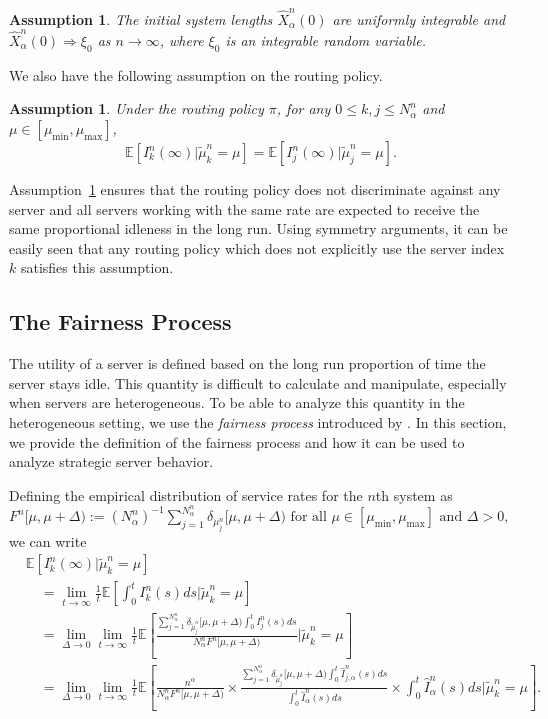 \documentclass[a4paper,11pt,twoside]{article}
\numberwithin{equation}{section}
\numberwithin{figure}{section}
\theoremstyle{plain}
\newtheorem{assumption}[theorem]{Assumption}
\newcommand{\EE}{\mathbb{E}}
\newcommand{\1}{\mathbbm{1}}
\begin{document}
\begin{assumption}\label{asm:initialcondition}
The initial system lengths $\hat{X}_\alpha^n(0)$ are uniformly integrable and $\hat{X}_\alpha^n(0)\Rightarrow \xi_0$ as $n\to\infty$, where $\xi_0$ is an integrable random variable. 
\end{assumption}

We also have the following assumption on the routing policy.
\begin{assumption}\label{asm:non-discrimating}
Under the routing policy $\pi$, for any $0\leq k,j\leq N_\alpha^n$ and $\mu\in[\mu_{\min},\mu_{\max}]$,
\[
\EE[I_k^n(\infty)|\tilde{\mu}_k^n=\mu]=\EE[I_j^n(\infty)|\tilde{\mu}_j^n=\mu].
\]
\end{assumption}


Assumption~\ref{asm:non-discrimating} ensures that the routing policy does not discriminate against any server and all servers working with the same rate are expected to receive the same proportional idleness in the long run. Using symmetry arguments, it can be easily seen that any routing policy which does not explicitly use the server index $k$ satisfies this assumption. 

\subsection{The Fairness Process}\label{sec:fairnessprocess}

The utility of a server is defined based on the long run proportion of time the server stays idle. This quantity is difficult to calculate and manipulate, especially when servers are heterogeneous. To be able to analyze this quantity in the heterogeneous setting, we use the  \emph{fairness process} introduced by \cite{bukeqin2019}. In this section, we provide the definition of the fairness process and how it can be used to analyze strategic server behavior.

Defining the empirical distribution of service rates for the $n$th system as
$F^n[\mu,\mu+\Delta) :=(N_\alpha^n)^{-1}\sum_{j=1}^{N_\alpha^n}\delta_{\mu_j^n}[\mu,\mu+\Delta) \mbox{ for all }\mu\in [\mu_{\min},\mu_{\max}]\mbox{ and }\Delta>0,$
we can write
\begin{align}
\nonumber
&\EE[I_k^n(\infty)|\tilde{\mu}_k^n=\mu]\\& \nonumber\quad= \lim_{t\to\infty}\frac{1}{t}\EE\left[\int_0^tI_k^n(s)ds|\tilde{\mu}_k^n=\mu\right]\\
    \nonumber&\quad=\lim_{\Delta\to 0}\lim_{t\to\infty}\frac{1}{t}\EE\left[\frac{\sum_{j=1}^{N_\alpha^n}\delta_{\tilde{\mu}_j^n}[\mu,\mu+\Delta)\int_0^tI_j^n(s)ds}{N_\alpha^nF^n[\mu,\mu+\Delta)} \Big| \tilde{\mu}_k^n=\mu\right]
    \\
    &\quad=\lim_{\Delta\to 0}\lim_{t\to\infty}\frac{1}{t}\EE\left[\frac{n^\alpha}{N_\alpha^nF^n[\mu,\mu+\Delta)}    \times\frac{\sum_{j=1}^{N_\alpha^n}\delta_{\tilde{\mu}_j^n}[\mu,\mu+\Delta) 
    \int_0^t\hat{I}_{j,\alpha}^n(s)ds}{\int_0^t \hat{I}_\alpha^{n}(s)ds}
    \times
    \int_0^t \hat{I}_\alpha^{n}(s)ds \Big| \tilde{\mu}_k^n=\mu\right].
    \label{eq:idleness_decomposition}
\end{align}
\end{document}

